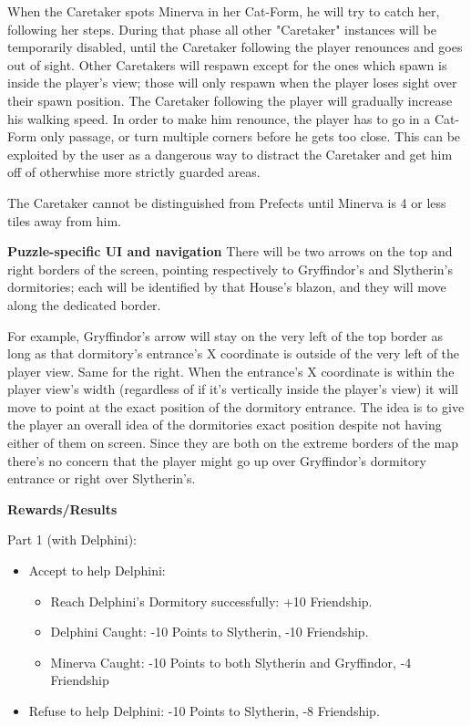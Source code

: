When the Caretaker spots Minerva in her Cat-Form, he will try to catch her, following her steps. During that phase all other "Caretaker" instances will be temporarily disabled, until the Caretaker following the player renounces and goes out of sight. Other Caretakers will respawn except for the ones which spawn is inside the player's view; those will only respawn when the player loses sight over their spawn position. The Caretaker following the player will gradually increase his walking speed. In order to make him renounce, the player has to go in a Cat-Form only passage, or turn multiple corners before he gets too close. This can be exploited by the user as a dangerous way to distract the Caretaker and get him off of otherwhise more strictly guarded areas.

The Caretaker cannot be distinguished from Prefects until Minerva is 4 or less tiles away from him.

\textbf{Puzzle-specific UI and navigation}
There will be two arrows on the top and right borders of the screen, pointing respectively to Gryffindor's and Slytherin's dormitories; each will be identified by that House's blazon, and they will move along the dedicated border.

For example, Gryffindor's arrow will stay on the very left of the top border as long as that dormitory's entrance's X coordinate is outside of the very left of the player view. Same for the right. When the entrance's X coordinate is within the player view's width (regardless of if it's vertically inside the player's view) it will move to point at the exact position of the dormitory entrance. The idea is to give the player an overall idea of the dormitories exact position despite not having either of them on screen. Since they are both on the extreme borders of the map there's no concern that the player might go up over Gryffindor's dormitory entrance or right over Slytherin's.

\textbf{Rewards/Results}

Part 1 (with Delphini):

\begin{itemize}
    \item Accept to help Delphini:
	\begin{itemize}
		\item Reach Delphini's Dormitory successfully: +10 Friendship.
		\item Delphini Caught: -10 Points to Slytherin, -10 Friendship.
		\item Minerva Caught: -10 Points to both Slytherin and Gryffindor, -4 Friendship
	\end{itemize}
	\item Refuse to help Delphini: -10 Points to Slytherin, -8 Friendship.
\end{itemize}

